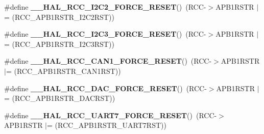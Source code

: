 \begin{DoxyCompactItemize}
\item 
\mbox{\label{group___r_c_c_ex___force___release___peripheral___reset_gaed404dfdc9bc032cf718b7ed17f664f0}} 
\#define {\bfseries \+\_\+\+\_\+\+H\+A\+L\+\_\+\+R\+C\+C\+\_\+\+I2\+C2\+\_\+\+F\+O\+R\+C\+E\+\_\+\+R\+E\+S\+ET}()~(R\+CC-\/$>$A\+P\+B1\+R\+S\+TR $\vert$= (R\+C\+C\+\_\+\+A\+P\+B1\+R\+S\+T\+R\+\_\+\+I2\+C2\+R\+ST))
\item 
\mbox{\label{group___r_c_c_ex___force___release___peripheral___reset_gaf0d824c0c76161daaefa6fd7ba2c0302}} 
\#define {\bfseries \+\_\+\+\_\+\+H\+A\+L\+\_\+\+R\+C\+C\+\_\+\+I2\+C3\+\_\+\+F\+O\+R\+C\+E\+\_\+\+R\+E\+S\+ET}()~(R\+CC-\/$>$A\+P\+B1\+R\+S\+TR $\vert$= (R\+C\+C\+\_\+\+A\+P\+B1\+R\+S\+T\+R\+\_\+\+I2\+C3\+R\+ST))
\item 
\mbox{\label{group___r_c_c_ex___force___release___peripheral___reset_ga9cadd1984daacca632f99a6f77677c28}} 
\#define {\bfseries \+\_\+\+\_\+\+H\+A\+L\+\_\+\+R\+C\+C\+\_\+\+C\+A\+N1\+\_\+\+F\+O\+R\+C\+E\+\_\+\+R\+E\+S\+ET}()~(R\+CC-\/$>$A\+P\+B1\+R\+S\+TR $\vert$= (R\+C\+C\+\_\+\+A\+P\+B1\+R\+S\+T\+R\+\_\+\+C\+A\+N1\+R\+ST))
\item 
\mbox{\label{group___r_c_c_ex___force___release___peripheral___reset_gad8ea14ca039a7298fecf64b829dc6384}} 
\#define {\bfseries \+\_\+\+\_\+\+H\+A\+L\+\_\+\+R\+C\+C\+\_\+\+D\+A\+C\+\_\+\+F\+O\+R\+C\+E\+\_\+\+R\+E\+S\+ET}()~(R\+CC-\/$>$A\+P\+B1\+R\+S\+TR $\vert$= (R\+C\+C\+\_\+\+A\+P\+B1\+R\+S\+T\+R\+\_\+\+D\+A\+C\+R\+ST))
\item 
\mbox{\label{group___r_c_c_ex___force___release___peripheral___reset_ga01ea883740306b58beb1a7413bc41109}} 
\#define {\bfseries \+\_\+\+\_\+\+H\+A\+L\+\_\+\+R\+C\+C\+\_\+\+U\+A\+R\+T7\+\_\+\+F\+O\+R\+C\+E\+\_\+\+R\+E\+S\+ET}()~(R\+CC-\/$>$A\+P\+B1\+R\+S\+TR $\vert$= (R\+C\+C\+\_\+\+A\+P\+B1\+R\+S\+T\+R\+\_\+\+U\+A\+R\+T7\+R\+ST))
\item 
\mbox{\label{group___r_c_c_ex___force___release___peripheral___reset_gac9bb36a0223b0dedf911cfb6fe4aeef1}} 

\end{DoxyCompactItemize}
